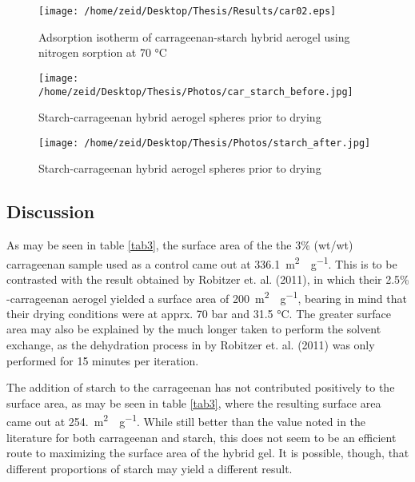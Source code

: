 \documentclass[a4paper,12pt]{article}
\begin{document}
\begin{figure}[H]
  \begin{center}
    \texttt{[image: /home/zeid/Desktop/Thesis/Results/car02.eps]}
    \caption{Adsorption isotherm of  carrageenan-starch hybrid aerogel using nitrogen sorption at 70 °C}
    \label{fig2}
  \end{center}
\end{figure}

\begin{figure}[H]
  \begin{center}
    \texttt{[image: /home/zeid/Desktop/Thesis/Photos/car\_starch\_before.jpg]}
    \caption{Starch-carrageenan  hybrid aerogel spheres prior to drying}
    \label{fig3}
  \end{center}
\end{figure}

\begin{figure}[H]
  \begin{center}
    \texttt{[image: /home/zeid/Desktop/Thesis/Photos/starch\_after.jpg]}
    \caption{Starch-carrageenan  hybrid aerogel spheres prior to drying}
    \label{fig4}
  \end{center}
\end{figure}

\subsection{Discussion}

As may be seen in table \ref{tab3}, the surface area of the the 3\% (wt/wt) carrageenan sample used as a control came out at \SI{336.1}{m^2\cdot g^{-1}}. This is to be contrasted with the result obtained by Robitzer et. al. (2011), in which their 2.5\% \textkappa-carrageenan aerogel yielded a surface area of \SI{200}{m^2\cdot g^{-1}}, bearing in mind that their drying conditions were at apprx. 70 bar and 31.5 °C. The greater surface area may also be explained by the much longer taken to perform the solvent exchange, as the dehydration process in by Robitzer et. al. (2011) was only performed for 15 minutes per iteration.\supercite{robitzer_nitrogen_2011}

The addition of starch to the carrageenan has not contributed positively to the surface area, as may be seen in table \ref{tab3}, where the resulting surface area came out at \SI{254.}{{m^2\cdot g^{-1}}}. While still better than the value noted in the literature for both carrageenan and starch, this does not seem to be an efficient route to maximizing the surface area of the hybrid gel. It is possible, though, that different proportions of starch may yield a different result.
\end{document}
